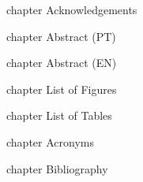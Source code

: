 \documentclass[
 paper=A4,               %
    twoside=true,           %
    openright,              %
    parskip=full,           %
    chapterprefix=true,     %
    11pt,                   %
    headings=normal,        %
    bibliography=totoc,     %
    listof=totoc,           %
    titlepage=on,           %
    captions=tableabove,    %
    draft=false,            %
]{scrreprt}
\theoremstyle{definition}
\newcommand{\LIMPA}{
\newpage
\mbox{}
\thispagestyle{empty}
}
\begin{document}
\setcounter{page}{1}

 {chapter} {Acknowledgements}


 {chapter} {Abstract (PT)}


 {chapter} {Abstract (EN)}




\tableofcontents

\LIMPA

\listoffigures

 {chapter} {List of Figures}
\newpage
\thispagestyle{empty}
\mbox{}
\newpage

\listoftables

 {chapter} {List of Tables}
\newpage
\thispagestyle{empty} \mbox{}
\newpage

\pagestyle{fancy}
\cleardoublepage

\setcounter{page}{1}












%
%
\LIMPA
\renewcommand{\glossaryname}{Acronyms}

\printglossaries
{} {chapter} {Acronyms}

\LIMPA


 {chapter} {Bibliography}
\end{document}
